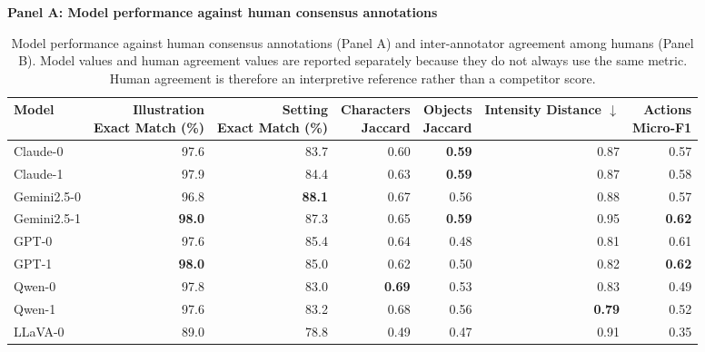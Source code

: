 \begin{table}[t]
  \centering
  \caption{Model performance against human consensus annotations (Panel A) and
  inter-annotator agreement among humans (Panel B). Model values and human
  agreement values are reported separately because they do not always use the
  same metric. Human agreement is therefore an interpretive reference rather
  than a competitor score.}
  \label{tab:model-human-evaluation}
  \small

  \textbf{Panel A: Model performance against human consensus annotations}
  \par\smallskip
  \begin{tabular}{lrrrrrr}
    \toprule
    Model &
    \shortstack{Illustration\\Exact Match (\%)} &
    \shortstack{Setting\\Exact Match (\%)} &
    \shortstack{Characters\\Jaccard} &
    \shortstack{Objects\\Jaccard} &
    \shortstack{Intensity\\Distance $\downarrow$} &
    \shortstack{Actions\\Micro-F1} \\
    \midrule
    Claude-0    & 97.6 & 83.7 & 0.60 & \textbf{0.59} & 0.87 & 0.57 \\
    Claude-1    & 97.9 & 84.4 & 0.63 & \textbf{0.59} & 0.87 & 0.58 \\
    Gemini2.5-0 & 96.8 & \textbf{88.1} & 0.67 & 0.56 & 0.88 & 0.57 \\
    Gemini2.5-1 & \textbf{98.0} & 87.3 & 0.65 & \textbf{0.59} & 0.95 & \textbf{0.62} \\
    GPT-0       & 97.6 & 85.4 & 0.64 & 0.48 & 0.81 & 0.61 \\
    GPT-1       & \textbf{98.0} & 85.0 & 0.62 & 0.50 & 0.82 & \textbf{0.62} \\
    Qwen-0      & 97.8 & 83.0 & \textbf{0.69} & 0.53 & 0.83 & 0.49 \\
    Qwen-1      & 97.6 & 83.2 & 0.68 & 0.56 & \textbf{0.79} & 0.52 \\
    LLaVA-0     & 89.0 & 78.8 & 0.49 & 0.47 & 0.91 & 0.35 \\
    \bottomrule
  \end{tabular}

  \vspace{0.9em}


\end{table}
